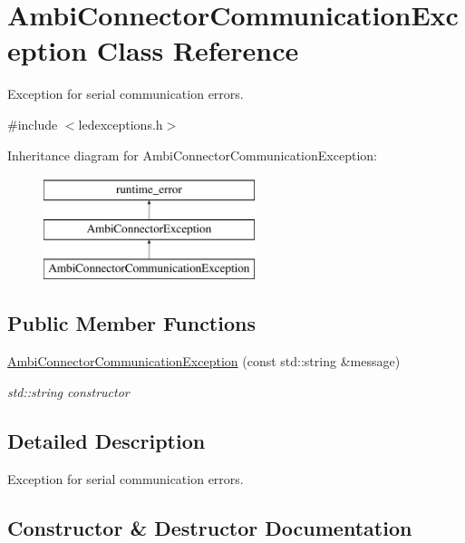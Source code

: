 \hypertarget{classAmbiConnectorCommunicationException}{}\section{Ambi\+Connector\+Communication\+Exception Class Reference}
\label{classAmbiConnectorCommunicationException}


Exception for serial communication errors.  




{\ttfamily \#include $<$ledexceptions.\+h$>$}

Inheritance diagram for Ambi\+Connector\+Communication\+Exception\+:\begin{figure}[H]
\begin{center}
\leavevmode
\includegraphics[height=3.000000cm]{classAmbiConnectorCommunicationException}
\end{center}
\end{figure}
\subsection*{Public Member Functions}
\begin{DoxyCompactItemize}
\item 
\hyperlink{classAmbiConnectorCommunicationException_a41f8ac30337b6f1e0c6f3562d42fbbb3}{Ambi\+Connector\+Communication\+Exception} (const std\+::string \&message)
\begin{DoxyCompactList}\small\item\em std\+::string constructor \end{DoxyCompactList}\end{DoxyCompactItemize}


\subsection{Detailed Description}
Exception for serial communication errors. 

\subsection{Constructor \& Destructor Documentation}
